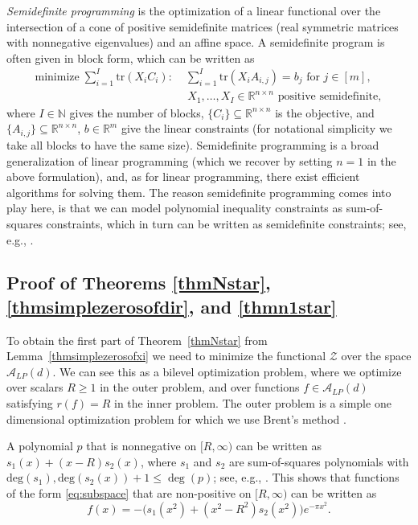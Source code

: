 \documentclass[reqno]{amsart}
\newcommand{\A}{\mathcal{A}}
\newcommand{\Z}{\mathcal{Z}}
\newcommand{\n}{\mathbb{N}}
\renewcommand{\r}{\mathbb{R}}
\begin{document}
\emph{Semidefinite programming} is the optimization of a linear functional over the intersection of a cone of positive semidefinite matrices (real symmetric matrices with nonnegative eigenvalues) and an affine space. A semidefinite program is often given in block form, which can be written as
\begin{align*}
\text{minimize} \; \sum_{i=1}^I \mathrm{tr}(X_iC_i) : \; & \sum_{i=1}^I \mathrm{tr}(X_iA_{i,j}) = b_j \text{ for } j \in [m],\\
& \,X_1,\ldots,X_I \in \mathbb R^{n \times n} \text{ positive semidefinite},
\end{align*}
where $I\in \n$ gives the number of blocks, $\{C_i\} \subseteq \r^{n \times n}$ is the objective, and $\{A_{i,j}\} \subseteq \r^{n \times n}$, $b \in \r^m$ give the linear constraints (for notational simplicity we take all blocks to have the same size).
Semidefinite programming is a broad generalization of linear programming (which we recover by setting $n=1$ in the above formulation), and, as for linear programming, there exist efficient algorithms for solving them. The reason semidefinite programming comes into play here, is that we can model polynomial inequality constraints as sum-of-squares constraints, which in turn can be written as semidefinite constraints; see, e.g., \cite{Bl}. 

\subsection{Proof of Theorems \ref{thmNstar}, \ref{thmsimplezerosofdir}, and \ref{thmn1star}}

To obtain the first part of Theorem~\ref{thmNstar} from Lemma~\ref{thmsimplezerosofxi} we need to minimize the functional $\Z$ over the space $\A_{LP}(d)$. We can see this as a bilevel optimization problem, where we optimize over scalars $R \geq 1$ in the outer problem, and over functions $f \in \A_{LP}(d)$ satisfying $r(f) = R$ in the inner problem. The outer problem is a simple one dimensional optimization problem for which we use Brent's method \cite{Br}.

A polynomial $p$ that is nonnegative on $[R,\infty)$ can be written as $s_1(x) + (x-R) s_2(x)$, where $s_1$ and $s_2$ are sum-of-squares polynomials with $\mathrm{deg}(s_1),\mathrm{deg}(s_2(x))+1 \leq \deg(p)$; see, e.g., \cite{PS}. This shows that functions of the form \eqref{eq:subspace} that are non-positive on $[R,\infty)$ can be written as
\[
f(x) = -\big(s_1(x^2) + (x^2-R^2) s_2(x^2)\big) e^{-\pi x^2}.
\]
\end{document}
